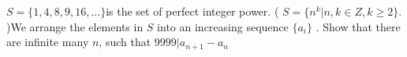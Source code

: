 $S= \{1,4,8,9,16,...\} $is the set of perfect integer power. ( $S=\{ n^k| n, k \in Z, k \ge 2 \}$. )We arrange the elements in $S$ into an increasing sequence $\{a_i\}$ . Show that there are infinite many $n$,  such that $9999|a_{n+1}-a_n$